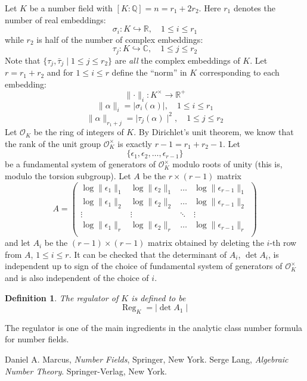 \documentclass[12pt]{article}
\newtheorem*{defn}{Definition}
\newcommand{\Reals}{\mathbb{R}}
\newcommand{\Complex}{\mathbb{C}}
\newcommand{\Rats}{\mathbb{Q}}
\begin{document}
Let $K$ be a number field with $[K:\Rats]=n=r_1+2r_2$. Here $r_1$
denotes the number of real embeddings:
$$\sigma_i\colon K \hookrightarrow \Reals,\quad 1\leq i\leq r_1$$
while $r_2$ is half of the number of complex embeddings:
$$\tau_j\colon K \hookrightarrow \Complex,\quad 1\leq j\leq r_2$$
Note that $\{\tau_j, \bar{\tau}_j\mid 1\leq j\leq r_2\}$ are
\emph{all} the complex embeddings of $K$. Let $r=r_1+r_2$ and for
$1\leq i\leq r$ define the ``norm'' in $K$ corresponding to each
embedding:
$$ \parallel \cdot \parallel _i\colon K^{\times} \to \Reals^+$$
$$ \parallel \alpha \parallel_i = \mid\sigma_i(\alpha)\mid, \quad
1\leq i \leq r_1$$
$$ \parallel \alpha \parallel_{r_1+j} = \mid\tau_j(\alpha)\mid^2, \quad
1\leq j \leq r_2$$ Let $\mathcal{O}_K$ be the ring of integers of
$K$. By Dirichlet's unit theorem, we know that the rank of the
unit group $\mathcal{O}_K^{\times}$ is exactly $r-1=r_1+r_2-1$.
Let
$$\{ \epsilon_1,\epsilon_2,\ldots,\epsilon_{r-1}\}$$
be a fundamental system of generators of $\mathcal{O}_K^{\times}$
modulo roots of unity (this is, modulo the torsion subgroup). Let
$A$ be the $r\times (r-1)$ matrix $$A=\left(
\begin{array}{cccc}
  \log \parallel \epsilon_1 \parallel_1 & \log \parallel \epsilon_2 \parallel_1 & \ldots & \log \parallel \epsilon_{r-1} \parallel_1 \\
  \log \parallel \epsilon_1 \parallel_2 & \log \parallel \epsilon_2 \parallel_2 & \ldots & \log \parallel \epsilon_{r-1} \parallel_2 \\
  \vdots & \vdots & \ddots & \vdots \\
  \log \parallel \epsilon_1 \parallel_r & \log \parallel \epsilon_2 \parallel_r & \ldots & \log \parallel \epsilon_{r-1} \parallel_r \\
\end{array}
\right)$$ and let $A_i$ be the $(r-1)\times(r-1)$ matrix obtained
by deleting the $i$-th row from $A$, $1\leq i\leq r$. It can be
checked that the determinant of $A_i$, $\det{A_i}$, is independent
up to sign of the choice of fundamental system of generators of
$\mathcal{O}_K^{\times}$ and is also independent of the choice of
$i$.
\begin{defn}
The \emph{regulator of} $K$ is defined to be
$$\operatorname{Reg}_K=\mid\det{A_1}\mid$$
\end{defn}

The regulator is one of the main ingredients in the analytic class number formula for number fields.

\begin{thebibliography}{9}
 Daniel A. Marcus, {\em Number Fields},
Springer, New York.
 Serge Lang, {\em Algebraic Number Theory}. Springer-Verlag, New York.
\end{thebibliography}
\end{document}
